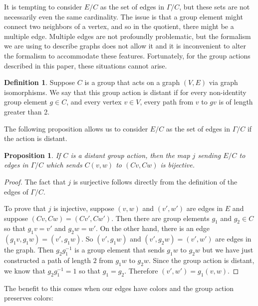 \documentclass[12pt,twoside,singlespace]{article}
\numberwithin{equation}{section}
\newtheorem{prop}[equation]{Proposition}
\theoremstyle{definition}
\newtheorem{definition}[equation]{Definition}
\begin{document}
It is tempting to consider $E/C$ as the set of edges in $\Gamma/C$, but these sets are not necessarily even the same cardinality.  The issue is that a group element might connect two neighbors of a vertex, and so in the quotient, there might be a multiple edge.  Multiple edges are not profoundly problematic, but the formalism we are using to describe graphs does not allow it and it is inconvenient to alter the formalism to accommodate these features.  Fortunately, for the group actions described in this paper, these situations cannot arise.

\begin{definition}
Suppose $C$ is a group that acts on a graph $(V,E)$ via graph isomorphisms.  We say that this group action is distant if for every non-identity group element $g\in C$, and every vertex $v\in V$, every path from $v$ to $gv$ is of length greater than 2.
\end{definition}

The following proposition allows us to consider $E/C$ as the set of edges in $\Gamma/C$ if the action is distant.

\begin{prop}
\label{prop:distiso}
If $C$ is a distant group action, then the map $j$ sending $E/C$ to edges in $\Gamma/C$ which sends $C(v,w)$ to $(Cv,Cw)$ is bijective.
\end{prop}
\begin{proof}
The fact that $j$ is surjective follows directly from the definition of the edges of $\Gamma/C$.

To prove that $j$ is injective, suppose $(v,w)$ and $(v',w')$ are edges in $E$ and suppose $(Cv,Cw)=(Cv',Cw')$.  Then there are group elements $g_1$ and $g_2\in C$ so that $g_1v=v'$ and $g_2w=w'$.  On the other hand, there is an edge $(g_1v,g_1w)=(v',g_1w)$.  So $(v',g_1w)$ and $(v',g_2w)=(v',w')$ are edges in the graph.  Then $g_2g_1^{-1}$ is a group element that sends $g_1w$ to $g_2w$ but we have just constructed a path of length $2$ from $g_1w$ to $g_2w$.  Since the group action is distant, we know that $g_2g_1^{-1}=1$ so that $g_1=g_2$.  Therefore $(v',w')=g_1(v,w)$.
\end{proof}

The benefit to this comes when our edges have colors and the group action preserves colors:
\end{document}
